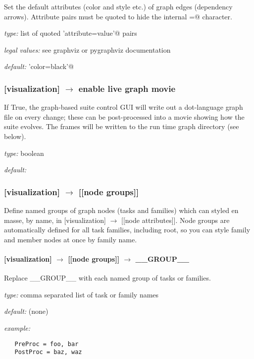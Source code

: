 Set the default attributes (color and style etc.) of graph edges
(dependency arrows).  Attribute pairs must be quoted to hide the
internal \lstinline@=@ character.
\begin{myitemize}
    \item {\em type:} list of quoted \lstinline@'attribute=value'@ pairs
    \item {\em legal values:} see graphviz or pygraphviz documentation
    \item {\em default:} \lstinline@'color=black'@
\end{myitemize}

\subsubsection[enable live graph movie]{[visualization] $\rightarrow$ enable live graph movie}

If True, the graph-based suite control GUI will write out a dot-language
graph file on every change; these can be post-processed into a movie
showing how the suite evolves. The frames will be written to the run
time graph directory (see below).

\begin{myitemize}
    \item {\em type:} boolean
    \item {\em default:} \lstinline@False@
\end{myitemize}

\subsubsection[{[[}node groups{]]}]{[visualization] $\rightarrow$ [[node groups]]}

Define named groups of graph nodes (tasks and families) which can styled
en masse, by name, in [visualization] $\rightarrow$ [[node attributes]].
Node groups are automatically defined for all task families, including
root, so you can style family and member nodes at once by family name.

\paragraph[\_\_GROUP\_\_]{[visualization] $\rightarrow$ [[node groups]] $\rightarrow$ \_\_GROUP\_\_}

Replace \_\_GROUP\_\_ with each named group of tasks or families.

\begin{myitemize}
    \item {\em type:} comma separated list of task or family names
    \item {\em default:} (none)
    \item {\em example:}
\begin{lstlisting}
   PreProc = foo, bar
   PostProc = baz, waz
\end{lstlisting}
\end{myitemize}

